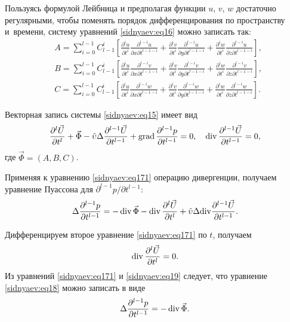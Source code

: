 Пользуясь формулой Лейбница и предполагая функции $u$, $v$, $w$ достаточно регулярными, чтобы поменять порядок дифференцирования по пространству и~времени, систему уравнений \eqref{sidnyaev:eq16} можно записать так:
\begin{equation}
\label{sidnyaev:eq17}
\begin{aligned}
& A=\sum\limits_{i=0}^{l-1} C_{l-1}^i \left[ \frac{\partial ^iu}{\partial
t^i}\frac{\partial ^{l-i}u}{\partial x\partial t^{l-1-i}}+\frac{\partial
^iv}{\partial t^i}\frac{\partial ^{l-i}u}{\partial y\partial
t^{l-1-i}}+\frac{\partial ^iw}{\partial t^i}\frac{\partial ^{l-i}u}{\partial
z\partial t^{l-1-i}} \right],\\
& B=\sum\limits_{i=0}^{l-1} C_{l-1}^i \left[
\frac{\partial ^iu}{\partial t^i}\frac{\partial ^{l-i}v}{\partial
x\partial t^{l-1-i}}+\frac{\partial ^iv}{\partial
t^i}\frac{\partial ^{l-i}v}{\partial y\partial
t^{l-1-i}}+\frac{\partial ^iw}{\partial t^i}\frac{\partial
^{l-i}v}{\partial z\partial t^{l-1-i}} \right],\\
& C=\sum\limits_{i=0}^{l-1} C_{l-1}^i \left[ \frac{\partial ^iu}{\partial
t^i}\frac{\partial ^{l-i}w}{\partial x\partial t^{l-1-i}}+\frac{\partial
^iv}{\partial t^i}\frac{\partial ^{l-i}w}{\partial y\partial
t^{l-1-i}}+\frac{\partial ^iw}{\partial t^i}\frac{\partial ^{l-i}w}{\partial
z\partial t^{l-1-i}}\right].
\end{aligned}
\end{equation}

Векторная запись системы \eqref{sidnyaev:eq15} имеет вид
\begin{equation}
\label{sidnyaev:eq171}
\frac{\partial ^l\vec {U}}{\partial t^l}+\vec {\Phi}-  \tilde{\upsilon}  \Delta
\frac{\partial ^{l-1}\vec {U}}{\partial t^{l-1}}+\mathop{\rm grad}\frac{\partial
^{l-1}p}{\partial t^{l-1}}=0,
\quad
\mathop{\rm div}\frac{\partial ^{l-1}\vec {U}}{\partial t^{l-1}}=0,
\end{equation}
где $\vec{\Phi}=(A, B, C)$.

Применяя к уравнению \eqref{sidnyaev:eq171} операцию дивергенции, получаем уравнение Пуассона
для ${\partial^{l-1}p}/{\partial t^{l-1}}$:
\begin{equation}
\label{sidnyaev:eq18}
 \Delta \frac{\partial ^{l-1}p}{\partial
t^{l-1}}=-\mathop{\rm div}\vec {\Phi}- \mathop{\rm div}\frac{\partial^l \vec {U}}{\partial t^l}+  \tilde{\upsilon}  \Delta {\rm div}\frac{\partial ^{l-1}\vec {U}}{\partial t^{l-1}}.
\end{equation}

Дифференцируем второе уравнение \eqref{sidnyaev:eq171} по $t$, получаем
\begin{equation}
\label{sidnyaev:eq19}
\mathop{\rm div}\frac{\partial^l \vec {U}}{\partial t^l}=0.
\end{equation}
Из уравнений \eqref{sidnyaev:eq171} и \eqref{sidnyaev:eq19} следует, что уравнение \eqref{sidnyaev:eq18} можно записать в виде
\begin{equation}
\label{sidnyaev:eq20}
\Delta \frac{\partial^{l-1}p}{\partial t^{l-1}}=-\mathop{\rm div}\vec {\Phi}.
\end{equation}

